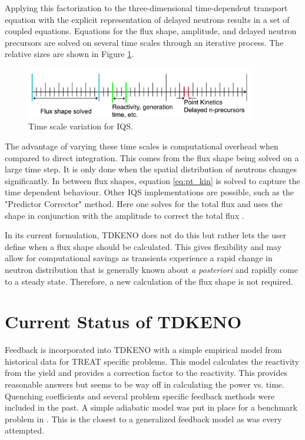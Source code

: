 \documentclass[11pt]{article}
\begin{document}
Applying this factorization to the three-dimensional time-dependent transport equation with the explicit representation of delayed neutrons results in a set of coupled equations.  Equations for the flux shape, amplitude, and delayed neutron precursors are solved on several time scales through an iterative process. The relative sizes are shown in Figure \ref{fig:time_scale}. 

\begin{figure}[h]
    \centering
    \includegraphics[width=10cm]{figures/time_scale.pdf}
    \caption{Time scale variation for IQS.}
    \label{fig:time_scale}
\end{figure}

The advantage of varying these time scales is computational overhead when compared to direct integration.  This comes from the flux shape being solved on a large time step. It is only done when the spatial distribution of neutrons changes significantly.  In between flux shapes, equation \ref{eq:pt_kin} is solved to capture the time dependent behaviour.  Other IQS implementations are possible, such as  the "Predictor Corrector" method.  Here one solves for the total flux and uses the shape in conjunction with the amplitude to correct the total flux \cite{Dulla}.  

 In its current formulation, TDKENO does not do this but rather lets the user define when a flux shape should be calculated.  This gives flexibility and may allow for computational savings as transients experience a rapid change in neutron distribution that is generally known about \emph{a posteriori} and rapidly come to a steady state. Therefore, a new calculation of the flux shape is not required.

\section{Current Status of TDKENO}
Feedback is incorporated into TDKENO with a simple empirical model from historical data for TREAT specific problems. This model calculates the reactivity from the yield and provides a correction factor to the reactivity.  This provides reasonable answers but seems to be way off in calculating the power vs. time.
Quenching coefficients and several problem specific feedback methods were included in the past.  A simple adiabatic model was put in place for a benchmark problem in \cite{Bentley}.  This is the closest to a generalized feedback model as was every attempted.  
\end{document}

